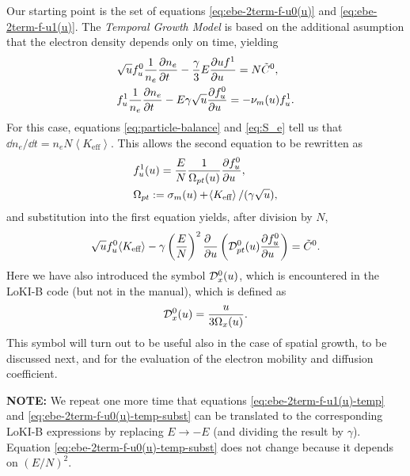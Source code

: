 \documentclass{book}
\newcommand{\MEAN}[1]{\ensuremath{\!\left\langle{{#1}}\right\rangle}}
\begin{document}
Our starting point is the set of equations \eqref{eq:ebe-2term-f-u0(u)} and
\eqref{eq:ebe-2term-f-u1(u)}. The {\em Temporal Growth Model} is based on the
additional asumption that the electron density depends only on time, yielding
\begin{align}
	&\sqrt{u}f^0_u\frac{1}{n_e}\PDEV{n_e}{t}
	- \frac{\gamma}{3}E\PDEV{u f^1}{u}
	=  N\tilde{C}^0,
	\\
	&f^1_u\frac{1}{n_e}\PDEV{n_e}{t}
	- E\gamma \sqrt{u}\PDEV{f^0_u}{u}
	= -\nu_m(u)f^1_u.
\end{align}
For this case, equations \eqref{eq:particle-balance} and \eqref{eq:S_e} tell us
that $\dd{n_e}/\dd{t}=n_eN\MEAN{K_{\text{eff}}}$. This allows the second
equation to be rewritten as
\begin{align}
	&f^1_u(u)
	= \frac{E}{N}\frac{1}{\Omega_{pt}(u)}\PDEV{f^0_u}{u},
	\label{eq:ebe-2term-f-u1(u)-temp} \\
	&\Omega_{pt} := \sigma_m(u) + \MEAN{K_{\text{eff}}}/(\gamma\sqrt{u}),
	\label{eq:OmegaPT}
\end{align}
and substitution into the first equation yields, after division by $N$,
\begin{equation}
	\sqrt{u}f^0_u\MEAN{K_{\text{eff}}}
	- \gamma\left(\frac{E}{N}\right)^2\PDEV{}{u}\left({\cal D}_{pt}^0(u)\PDEV{f^0_u}{u}\right)
	= \tilde{C}^0.
	\label{eq:ebe-2term-f-u0(u)-temp-subst}
\end{equation}
Here we have also introduced the symbol ${\cal D}_x^0(u)$, which is encountered in the
LoKI-B code (but not in the manual), which is defined as
\begin{equation}
	{\cal D}_x^0(u) = \frac{u}{3\Omega_x(u)}.
	\label{eq:D0}
\end{equation}
This symbol will turn out to be useful also in the case of spatial growth, to be discussed next,
and for the evaluation of the electron mobility and diffusion coefficient.

\begin{framed}
{\bf NOTE: } We repeat one more time that equations \eqref{eq:ebe-2term-f-u1(u)-temp} and
\eqref{eq:ebe-2term-f-u0(u)-temp-subst} can be translated to the corresponding LoKI-B expressions
\cite[eq. 7a with 12a substituted, and 7b]{Manual_2_2_0} by replacing $E\rightarrow -E$ (and
dividing the result by $\gamma$).
Equation \eqref{eq:ebe-2term-f-u0(u)-temp-subst} does not change because it depends on
$(E/N)^2$.
\end{framed}
\end{document}
